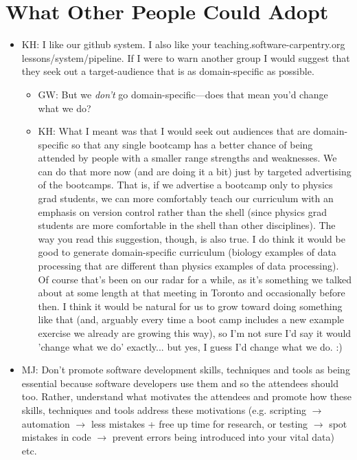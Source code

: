 \documentclass{article}
\begin{document}
\section{What Other People Could Adopt}

\begin{itemize}

  \item KH: I like our github system. I also like your teaching.software-carpentry.org lessons/system/pipeline. If I were to warn another group I would suggest that they seek out a target-audience that is as domain-specific as possible.
    \begin{itemize}
      \item GW: But we \emph{don't} go domain-specific---does that mean you'd change what we do?
      \item KH: What I meant was that I would seek out audiences that are domain-specific so that any single bootcamp has a better chance of being attended by people with a smaller range strengths and weaknesses. We can do that more now (and are doing it a bit) just by targeted advertising of the bootcamps. That is, if we advertise a bootcamp only to physics grad students, we can more comfortably teach our curriculum with an emphasis on version control rather than the shell (since physics grad students are more comfortable in the shell than other disciplines). The way you read this suggestion, though, is also true. I do think it would be good to generate domain-specific curriculum (biology examples of data processing that are different than physics examples of data processing). Of course that's been on our radar for a while, as it's something we talked about at some length at that meeting in Toronto and occasionally before then. I think it would be natural for us to grow toward doing something like that (and, arguably every time a boot camp includes a new example exercise we already are growing this way), so I'm not sure I'd say it would 'change what we do' exactly... but yes, I guess I'd change what we do. :) 
    \end{itemize}

  \item MJ: Don't promote software development skills, techniques and tools as being essential because software developers use them and so the attendees should too. Rather, understand what motivates the attendees and promote how these skills, techniques and tools address these motivations (e.g. scripting $\rightarrow$ automation $\rightarrow$ less mistakes + free up time for research, or testing $\rightarrow$ spot mistakes in code $\rightarrow$ prevent errors being introduced into your vital data) etc.


\end{itemize}
\end{document}
